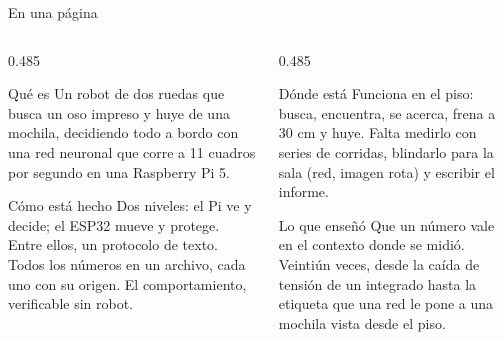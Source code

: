 \begin{frame}{En una página}
  \begin{columns}[T,onlytextwidth]
    \begin{column}{0.485\textwidth}
      \begin{block}{Qué es}
        {\small Un robot de dos ruedas que busca un oso impreso y huye de una
        mochila, decidiendo todo a bordo con una red neuronal que corre a 11
        cuadros por segundo en una Raspberry Pi 5.}
      \end{block}
      \begin{block}{Cómo está hecho}
        {\small Dos niveles: el Pi ve y decide; el ESP32 mueve y protege. Entre
        ellos, un protocolo de texto. Todos los números en un archivo, cada
        uno con su origen. El comportamiento, verificable sin robot.}
      \end{block}
    \end{column}
    \begin{column}{0.485\textwidth}
      \begin{block}{Dónde está}
        {\small Funciona en el piso: busca, encuentra, se acerca, frena a 30 cm y
        huye. Falta medirlo con series de corridas, blindarlo para la sala
        (red, imagen rota) y escribir el informe.}
      \end{block}
      \begin{alertblock}{Lo que enseñó}
        {\small Que un número vale en el contexto donde se midió. Veintiún veces,
        desde la caída de tensión de un integrado hasta la etiqueta que una red
        le pone a una mochila vista desde el piso.}
      \end{alertblock}
    \end{column}
  \end{columns}
\end{frame}
